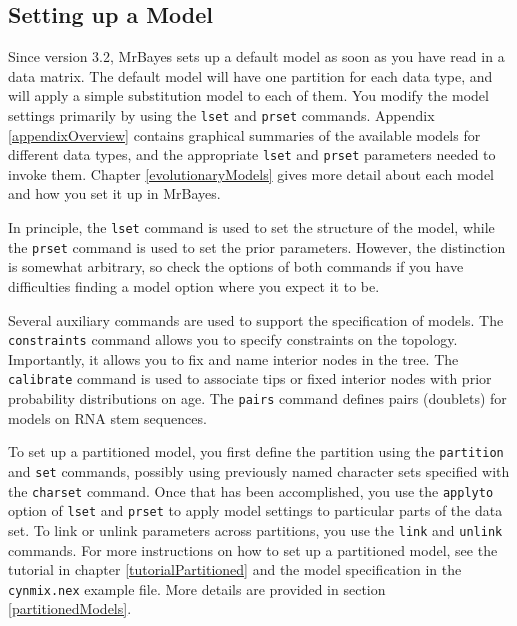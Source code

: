 \documentclass[12pt]{book}
\newcommand{\ttt}[1]{\texttt{#1}}
\begin{document}
\subsection{Setting up a Model}

Since version 3.2, MrBayes sets up a default model as soon as you have read in a data matrix. The
default model will have one partition for each data type, and will apply a simple substitution
model to each of them. You modify the model settings primarily by using the \ttt{lset} and
\ttt{prset} commands. Appendix \ref{appendixOverview} contains graphical summaries of the available models
for different data types, and the appropriate \ttt{lset} and \ttt{prset} parameters needed to
invoke them. Chapter \ref{evolutionaryModels} gives more detail about each model and how you set it
up in MrBayes.

In principle, the \ttt{lset} command is used to set the structure of the model, while the
\ttt{prset} command is used to set the prior parameters. However, the distinction is somewhat
arbitrary, so check the options of both commands if you have difficulties finding a model option
where you expect it to be.

Several auxiliary commands are used to support the specification of models. The \ttt{constraints}
command allows you to specify constraints on the topology. Importantly, it allows you to fix and
name interior nodes in the tree. The \ttt{calibrate} command is used to associate tips or fixed
interior nodes with prior probability distributions on age. The \ttt{pairs} command defines pairs
(doublets) for models on RNA stem sequences.

To set up a partitioned model, you first define the partition using the \ttt{partition} and
\ttt{set} commands, possibly using previously named character sets specified with the \ttt{charset}
command. Once that has been accomplished, you use the \ttt{applyto} option of \ttt{lset} and
\ttt{prset} to apply model settings to particular parts of the data set. To link or unlink
parameters across partitions, you use the \ttt{link} and \ttt{unlink} commands. For more
instructions on how to set up a partitioned model, see the tutorial in chapter
\ref{tutorialPartitioned} and the model specification in the \ttt{cynmix.nex} example file. More
details are provided in section \ref{partitionedModels}.
\end{document}
